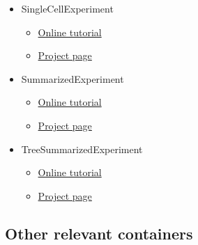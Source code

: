 \documentclass[
]{book}
\providecommand{\tightlist}{%
  \setlength{\itemsep}{0pt}\setlength{\parskip}{0pt}}
\begin{document}
\begin{itemize}
\tightlist
\item
  SingleCellExperiment \citep{R-SingleCellExperiment}

  \begin{itemize}
  \tightlist
  \item
    \href{https://bioconductor.org/packages/release/bioc/vignettes/SingleCellExperiment/inst/doc/intro.html}{Online tutorial}
  \item
    \href{https://bioconductor.org/packages/release/bioc/html/SingleCellExperiment.html}{Project page}
  \end{itemize}
\item
  SummarizedExperiment \citep{R-SummarizedExperiment}

  \begin{itemize}
  \tightlist
  \item
    \href{https://bioconductor.org/packages/release/bioc/vignettes/SummarizedExperiment/inst/doc/SummarizedExperiment.html}{Online tutorial}
  \item
    \href{https://bioconductor.org/packages/release/bioc/html/SummarizedExperiment.html}{Project page}
  \end{itemize}
\item
  TreeSummarizedExperiment \citep{R-TreeSummarizedExperiment}

  \begin{itemize}
  \tightlist
  \item
    \href{https://bioconductor.org/packages/release/bioc/vignettes/TreeSummarizedExperiment/inst/doc/Introduction_to_treeSummarizedExperiment.html}{Online tutorial}
  \item
    \href{https://www.bioconductor.org/packages/release/bioc/html/TreeSummarizedExperiment.html}{Project page}
  \end{itemize}
\end{itemize}

\hypertarget{other-relevant-containers}{%
\subsection{Other relevant containers}\label{other-relevant-containers}}
\end{document}
